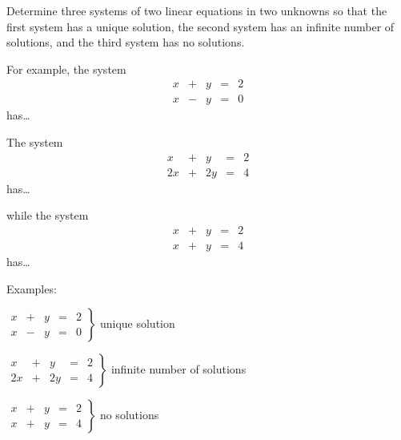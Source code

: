\documentclass{ximera}
\begin{document}
\begin{exercise} \label{c2.2.6}
Determine three systems of two linear equations in two unknowns
so that the first system has a unique solution, the second
system has an infinite number of solutions, and the third system
has no solutions.

\begin{prompt}
  For example, the system
  \[\begin{array}{rrrrr}
x & + & y & = & 2 \\
x & - & y & = & 0\end{array}\]
has\ldots
\begin{multipleChoice}
\end{multipleChoice}

The system
\[\begin{array}{rrrrr}
x & + & y & = & 2 \\
    2x & + & 2y & = & 4\end{array}\]
has\ldots
\begin{multipleChoice}
\end{multipleChoice}
while the system
\[\begin{array}{rrrrr}
x & + & y & = & 2 \\
    x & + & y & = & 4\end{array}\]
has\ldots
\begin{multipleChoice}
\end{multipleChoice}
\end{prompt}

\begin{solution}

\ans Examples:

$\left. \begin{array}{rrrrr}
x & + & y & = & 2 \\
x & - & y & = & 0\end{array} \right\}$
unique solution

$\left. \begin{array}{rrrrr}
x & + & y & = & 2 \\
2x & + & 2y & = & 4\end{array} \right\}$
infinite number of solutions

$\left. \begin{array}{rrrrr}
x & + & y & = & 2 \\
x & + & y & = & 4\end{array} \right\}$
no solutions

\end{solution}
\end{exercise}
\end{document}

